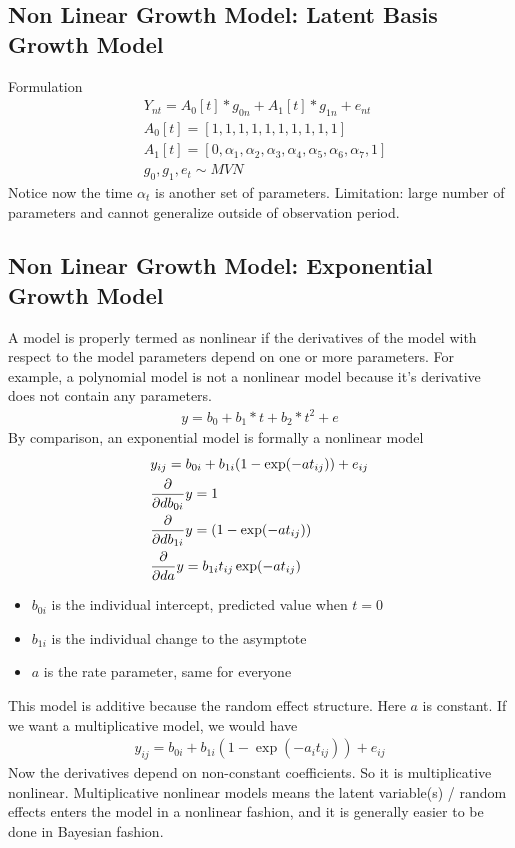 \subsection{Non Linear Growth Model: Latent Basis Growth Model} 
Formulation 
    \begin{align*}
        & Y_{nt} = A_0[t] * g_{0n} + A_1[t]*g_{1n} + e_{nt}\\
        & A_0[t] = [1,1,1,1,1,1,1,1,1,1]\\
        & A_1[t] = [0,\alpha_1, \alpha_2, \alpha_3, \alpha_4, \alpha_5, \alpha_6, \alpha_7,1]\\
        & g_0, g_1, e_t \sim MVN
    \end{align*}
Notice now the time $\alpha_t$ is another set of parameters. Limitation: large number of parameters and cannot generalize outside of observation period. 

\subsection{Non Linear Growth Model: Exponential Growth Model} 

A model is properly termed as nonlinear if the derivatives of the model with respect to the model parameters depend on one or more parameters. For example, a polynomial model is not a nonlinear model because it's derivative does not contain any parameters. 
    \begin{align*}
        y = b_0 + b_1 * t + b_2 * t^2 + e
    \end{align*}
By comparison, an exponential model is formally a nonlinear model 
    \begin{align*}
        & y_{ij} = b_{0i} + b_{1i}(1-\exp(-at_{ij})) + e_{ij}\\
        & \frac{\partial}{\partial db_{0i}}y = 1\\
        & \frac{\partial}{\partial db_{1i}}y = (1-\exp(-at_{ij})) \\
        & \frac{\partial}{\partial da}y = b_{1i}t_{ij}\exp(-at_{ij})
    \end{align*}
    \begin{itemize}
        \item $b_{0i}$ is the individual intercept, predicted value when $t= 0$
        \item $b_{1i}$ is the individual change to the asymptote 
        \item $a$ is the rate parameter, same for everyone 
    \end{itemize}
This model is additive because the random effect structure. Here $a$ is constant. If we want a multiplicative model, we would have 
    \begin{align*}
        y_{ij} = b_{0i} + b_{1i}(1-\exp(-a_it_{ij})) + e_{ij}
    \end{align*}
Now the derivatives depend on non-constant coefficients. So it is multiplicative nonlinear. Multiplicative nonlinear models means the latent variable(s) / random effects enters the model in a nonlinear fashion, and it is generally easier to be done in Bayesian fashion. 


